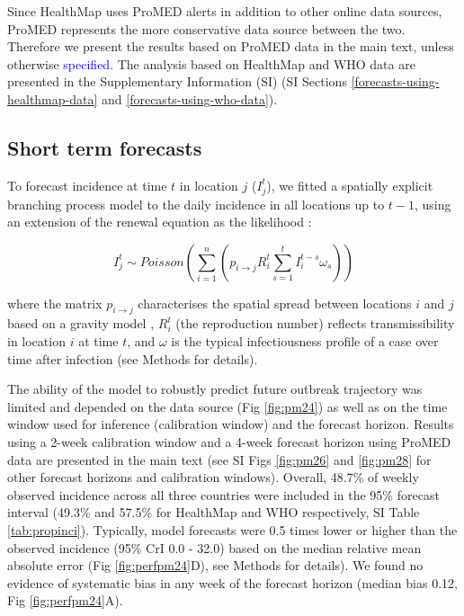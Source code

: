 \documentclass[9pt,twocolumn,twoside,lineno]{pnas-new}
\newcommand{\sangeeta}[1]{\textcolor{blue}{#1}}
\begin{document}
Since HealthMap uses ProMED alerts in addition to other online data
sources, ProMED represents the more conservative data source between the
two. Therefore we present the results based on ProMED data in the main
text, unless otherwise \sangeeta{specified}. The analysis based on HealthMap and
WHO data are presented in the
Supplementary Information (SI) (SI Sections \ref{forecasts-using-healthmap-data}
and \ref{forecasts-using-who-data}).


\subsection*{Short term forecasts}\label{short-term-forecasts}

To forecast incidence at time \(t\) in location \(j\) (\(I_{j}^{t}\)),
we fitted a spatially explicit branching process model to the daily
incidence in all locations up to \(t - 1\), using an extension of the
renewal equation as the likelihood \cite{fraser2007estimating}:

\begin{equation}
I_{j}^{t} \sim Poisson\left(\sum_{i = 1}^n\left({p_{i \rightarrow j} R_{i}^{t}
\sum_{s = 1}^t{I_{i}^{t - s} \omega_s}}\right)\right)
\label{eq:model}
\end{equation}

where the matrix \(p_{i \rightarrow j}\) characterises the spatial
spread between locations \(i\) and \(j\) based on a gravity model
\cite{zipf1946p}, \(R_{i}^{t}\) (the reproduction number) reflects
transmissibility in location \(i\) at time \(t\), and \(\omega\) is the
typical infectiousness profile of a case over time after infection (see
Methods for details).

The ability of the model to robustly predict future outbreak
trajectory was limited and depended on the data source (Fig \ref{fig:pm24})
as well as on the time window used for inference (calibration window)
and the forecast horizon. Results using a 2-week calibration window
and a 4-week forecast horizon using ProMED data are presented in
the main text (see SI Figs \ref{fig:pm26} and \ref{fig:pm28} for other 
forecast horizons and calibration windows).
Overall, 48.7\% of weekly observed incidence across
all three countries were included in the 95\%
forecast interval (49.3\% and 57.5\% for HealthMap and WHO
respectively, SI Table \ref{tab:propinci}).
Typically, model forecasts were 0.5 times lower or higher
than the observed incidence (95\% CrI 0.0 - 32.0) based on the 
median relative mean absolute
error (Fig \ref{fig:perfpm24}D), see Methods for details). We found no evidence of
systematic bias in any week of the forecast horizon (median bias 0.12,
Fig \ref{fig:perfpm24}A).
\end{document}
